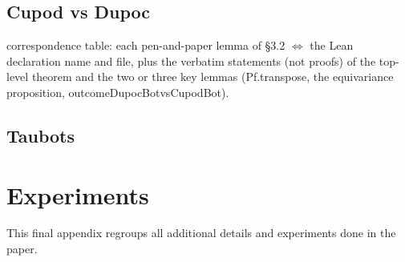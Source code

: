 \documentclass[twoside,11pt]{article}
\begin{document}
\subsection{Cupod vs Dupoc}
\label{apx-subsection:Lean-Dupoc}
correspondence table: each pen-and-paper lemma of §3.2 $\iff$ the Lean declaration name and file, plus the verbatim statements (not proofs) of the top-level theorem and the two or three key lemmas (Pf.transpose, the equivariance proposition, outcomeDupocBotvsCupodBot).

\subsection{Taubots}
\label{apx-subsection:Lean-Taubots}

\section{Experiments}
This final appendix regroups all additional details and experiments done in the paper.
\end{document}
